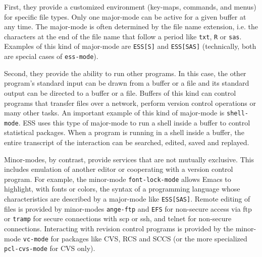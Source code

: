 \documentclass{article}
\newcommand{\stexttt}[1]{{\small\texttt{#1}}}
\begin{document}
First, they provide a customized environment (key-maps, commands, and menus) 
for specific file types.  Only 
one major-mode can be active for a given buffer at any time.  The major-mode 
is often determined by the file name extension, i.e. the characters at the 
end of the file name that follow a period like \stexttt{txt}, \stexttt{R} or
\stexttt{sas}.  Examples of this kind of major-mode are \stexttt{ESS[S]} and 
\stexttt{ESS[SAS]} (technically, both are special cases of \stexttt{ess-mode}).

Second, they provide the ability to run other programs.
In this case, the other program's standard input can be drawn from a buffer
or a file and its standard output can be directed to a buffer or a
file.  Buffers of this kind can control programs that transfer files
over a network, perform version control operations or many other
tasks.  An important example of this kind of major-mode is
\stexttt{shell-mode}.  ESS uses this type of major-mode to run a shell
inside a buffer to control statistical packages.  When a program is running 
in a shell inside a buffer, the entire transcript of the interaction can 
be searched, edited, saved and replayed.

Minor-modes, by contrast, provide services that are not mutually
exclusive.  This includes emulation of another editor or cooperating
with a version control program.  For example, the minor-mode
\stexttt{font-lock-mode} allows Emacs to highlight, with fonts or
colors, the syntax of a programming language whose characteristics are
described by a major-mode like \stexttt{ESS[SAS]}.  Remote editing of files is
provided by minor-modes \stexttt{ange-ftp} and \stexttt{EFS} for
non-secure access via ftp or \stexttt{tramp} for secure connections
with scp or ssh, and telnet for non-secure connections.
Interacting with revision control programs is provided by the minor-mode 
\stexttt{vc-mode} for packages like CVS, RCS and SCCS (or the more
specialized \stexttt{pcl-cvs-mode} for CVS only).
\end{document}
